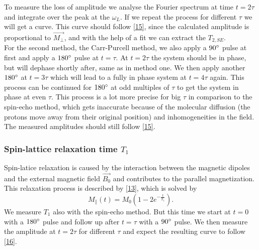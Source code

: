 To measure the loss of amplitude we analyse the Fourier spectrum at time $t=2\tau$ and integrate over the peak at the $\omega_L$. If we repeat the process for different $\tau$ we will get a curve. This curve should follow \eqref{15}, since the calculated amplitude is proportional to $\vec{M_{\perp}}$, and with the help of a fit we can extract the $T_{2,SE}$.
\vspace{3mm} \\
For the second method, the Carr-Purcell method, we also apply a $90\degree$ pulse at first and apply a $180\degree$ pulse at $t=\tau$. At $t=2\tau$ the system should be in phase, but will dephase shortly after, same as in method one. We then apply another $180\degree$ at $t=3\tau$ which will lead to a fully in phase system at $t=4\tau$ again. This process can be continued for $180\degree$ at odd multiples of $\tau$ to get the system in phase at even $\tau$. This process is a lot more precise for big $\tau$ in comparison to the spin-echo method, which gets inaccurate because of the molecular diffusion (the protons move away from their original position) and inhomogeneities in the field.\\
The measured amplitudes should still follow \eqref{15}.
\subsubsection{Spin-lattice relaxation time $T_{1}$}
Spin-latice relaxation is caused by the interaction between the magnetic dipoles and the external magnetic field $\vec{B_0}$ and contributes to the parallel magnetization. This relaxation process is described by \eqref{13}, which is solved by
\begin{equation}
	\label{16}
	M_{\parallel}(t) = M_{0}(1-2e^{-\frac{t}{T_{1}}}).
\end{equation}
We measure $T_1$ also with the spin-echo method. But this time we start at $t=0$ with a $180\degree$ pulse and follow up after $t=\tau$ with a $90\degree$ pulse. We then measure the amplitude at $t=2\tau$ for different $\tau$ and expect the resulting curve to follow \eqref{16}.
